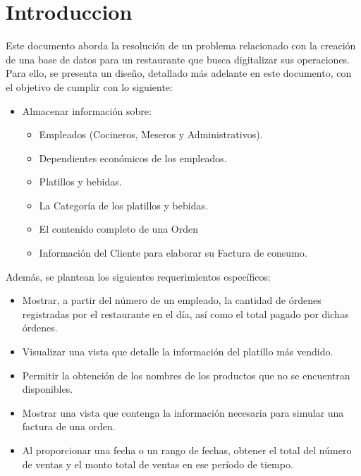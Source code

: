 \documentclass[12pt, letterpaper]{article} %
\begin{document}
\newpage

\tableofcontents

\newpage
\section{Introduccion}

Este documento aborda la resolución de un problema relacionado con la creación de una base de datos para un restaurante que busca digitalizar sus operaciones. Para ello, se presenta un diseño, detallado más adelante en este documento, con el objetivo de cumplir con lo siguiente:

\begin{itemize}
    \item Almacenar información sobre:
        \begin{itemize}
            \item Empleados (Cocineros, Meseros y Administrativos).
            \item Dependientes económicos de los empleados.
            \item Platillos y bebidas.
            \item La Categoría de los platillos y bebidas.
            \item El contenido completo de una Orden
            \item Información del Cliente para elaborar su Factura de consumo.
        \end{itemize}
    
\end{itemize}

Además, se plantean los siguientes requerimientos específicos:
\begin{itemize}
    \item Mostrar, a partir del número de un empleado, la cantidad de órdenes registradas por el restaurante en el día, así como el total pagado por dichas órdenes.

    \item Visualizar una vista que detalle la información del platillo más vendido.

    \item Permitir la obtención de los nombres de los productos que no se encuentran disponibles.

    \item Mostrar una vista que contenga la información necesaria para simular una factura de una orden.

    \item Al proporcionar una fecha o un rango de fechas, obtener el total del número de ventas y el monto total de ventas en ese período de tiempo.
\end{itemize}
\end{document}
